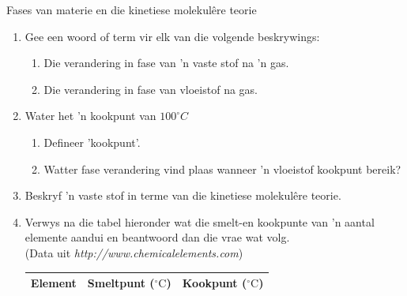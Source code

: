             \begin{eocexercises}{Fases van materie en die kinetiese molekul\^{e}re teorie}
            \nopagebreak \noindent \vspace{-1cm}
\label{m38730*id311490}\begin{enumerate}[noitemsep, label=\textbf{\arabic*}. ] 
            \label{m38730*uid87}\item Gee een woord of term vir elk van die volgende beskrywings:
\label{m38730*id311506}\begin{enumerate}[noitemsep, label=\textbf{\alph*}. ] 
            \label{m38730*uid88}\item Die verandering in fase van 'n vaste stof na 'n gas.
\label{m38730*uid89}\item Die verandering in fase van vloeistof na gas.
\end{enumerate}
                \label{m38730*uid103}\item Water het 'n kookpunt van $100 ^{\circ} C$
\label{m38730*id311744}\begin{enumerate}[noitemsep, label=\textbf{\alph*}. ] 
            \label{m38730*uid104}\item Defineer 'kookpunt'.
\label{m38730*uid105}\item Watter fase verandering vind plaas wanneer 'n vloeistof kookpunt bereik?
\end{enumerate}
\label{m38730*id762}\item Beskryf 'n vaste stof in terme van die kinetiese molekul\^{e}re teorie. \newline
            \label{m38730*uid108}\item Verwys na die tabel hieronder wat die smelt-en kookpunte van 'n aantal elemente aandui en beantwoord dan die vrae wat volg. \\
(Data uit \textsl{http://www.chemicalelements.com})
          \begin{table}[H]
        \begin{center}
      \label{m38730*id311817}
      \begin{tabular}{|l|l|l|}\hline
\textbf{Element} & \textbf{Smeltpunt ($^{\circ} \text{C}$)} & \textbf{Kookpunt ($^{\circ} \text{C}$)} \\ \hline

\end{tabular}
\end{center}
\end{table}
\end{enumerate}
\end{eocexercises}
